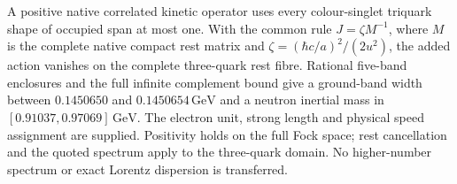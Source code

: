 A positive native correlated kinetic operator uses every colour-singlet
triquark shape of occupied span at most one. With the common rule
$J=\zeta M^{-1}$, where $M$ is the complete native compact rest matrix and
$\zeta=(\hbar c/a)^2/(2u^2)$, the added action vanishes on the complete
three-quark rest fibre. Rational five-band enclosures and the full infinite
complement bound give a ground-band width between
$0.1450650$ and $0.1450654\,\mathrm{GeV}$ and a neutron inertial mass in
$[0.91037,0.97069]\,\mathrm{GeV}$. The electron unit, strong length and physical
speed assignment are supplied. Positivity holds on the full Fock space;
rest cancellation and the quoted spectrum apply to the three-quark domain.
No higher-number spectrum or exact Lorentz dispersion is transferred.
